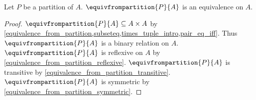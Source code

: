 \begin{proposition}\label{equivalence_from_partition_is_equivalence}
    Let $P$ be a partition of $A$.
    $\equivfrompartition{P}{A}$ is an equivalence on $A$.
\end{proposition}
\begin{proof}
    $\equivfrompartition{P}{A}\subseteq A\times A$
        by \cref{equivalence_from_partition,subseteq,times_tuple_intro,pair_eq_iff}.
    Thus $\equivfrompartition{P}{A}$ is a binary relation on $A$.
    $\equivfrompartition{P}{A}$ is reflexive on $A$
        by \cref{equivalence_from_partition_reflexive}.
    $\equivfrompartition{P}{A}$ is transitive
        by \cref{equivalence_from_partition_transitive}.
    $\equivfrompartition{P}{A}$ is symmetric
        by \cref{equivalence_from_partition_symmetric}.
\end{proof}

